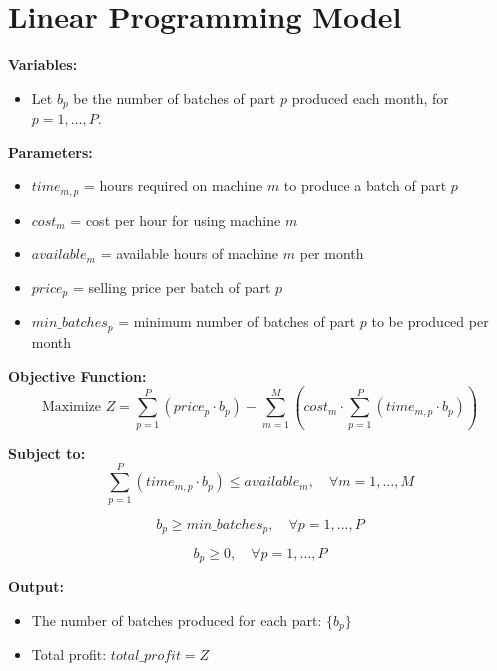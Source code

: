 \documentclass{article}
\begin{document}
\section*{Linear Programming Model}

\textbf{Variables:}
\begin{itemize}
    \item Let \( b_p \) be the number of batches of part \( p \) produced each month, for \( p = 1, \ldots, P \).
\end{itemize}

\textbf{Parameters:}
\begin{itemize}
    \item \( time_{m,p} \) = hours required on machine \( m \) to produce a batch of part \( p \)
    \item \( cost_{m} \) = cost per hour for using machine \( m \)
    \item \( available_{m} \) = available hours of machine \( m \) per month
    \item \( price_{p} \) = selling price per batch of part \( p \)
    \item \( min\_batches_{p} \) = minimum number of batches of part \( p \) to be produced per month
\end{itemize}

\textbf{Objective Function:}
\[
\text{Maximize } Z = \sum_{p=1}^{P} (price_{p} \cdot b_p) - \sum_{m=1}^{M} \left( cost_{m} \cdot \sum_{p=1}^{P} (time_{m,p} \cdot b_p) \right)
\]

\textbf{Subject to:}
\begin{equation}
\sum_{p=1}^{P} (time_{m,p} \cdot b_p) \leq available_{m}, \quad \forall m = 1, \ldots, M
\end{equation}

\begin{equation}
b_p \geq min\_batches_{p}, \quad \forall p = 1, \ldots, P
\end{equation}

\begin{equation}
b_p \geq 0, \quad \forall p = 1, \ldots, P
\end{equation}

\textbf{Output:}
\begin{itemize}
    \item The number of batches produced for each part: \( \{ b_p \} \)
    \item Total profit: \( total\_profit = Z \)
\end{itemize}
\end{document}
